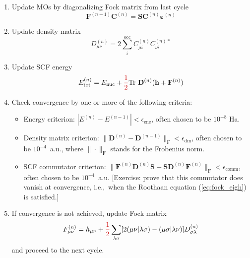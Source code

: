 \documentclass[parskip=full]{article}
\newcommand{\myred}[1]{\textcolor{myred}{#1}}
\begin{document}
\begin{enumerate}
        \begin{enumerate}
            \item Update MOs by diagonalizing Fock matrix from last cycle
            \begin{equation}    \label{eq:fock_eigh}
                \mathbf{F}^{(n-1)} \mathbf{C}^{(n)}
                    = \mathbf{S} \mathbf{C}^{(n)} \bm{\varepsilon}^{(n)}
            \end{equation}
            \item Update density matrix
            \begin{equation}
                D^{(n)}_{\mu\nu}
                    = 2 \sum_{i}^{\textrm{occ}} C^{(n)}_{\mu i} C^{(n)*}_{\nu i}
            \end{equation}
            \item Update SCF energy
            \begin{equation}    \label{eq:scf_energy}
                E^{(n)}_{\textrm{tot}}
                    = E_{\textrm{nuc}} + \myred{\frac{1}{2}} \mathrm{Tr}~\mathbf{D}^{(n)} (\mathbf{h} + \mathbf{F}^{(n)})
            \end{equation}
            \item Check convergence by one or more of the following criteria:
            \begin{itemize}
                \item Energy criterion: $|E^{(n)} - E^{(n-1)}| < \epsilon_{\textrm{ene}}$, often chosen to be $10^{-8}$ Ha.
                \item Density matrix criterion: $\|\mathbf{D}^{(n)} - \mathbf{D}^{(n-1)}\|_{\textrm{F}} < \epsilon_{\textrm{dm}}$, often chosen to be $10^{-4}$~a.u., where $\|\cdot\|_{\textrm{F}}$ stands for the Frobenius norm.
                \item SCF commutator criterion: $\|\mathbf{F}^{(n)}\mathbf{D}^{(n)}\mathbf{S} - \mathbf{S}\mathbf{D}^{(n)}\mathbf{F}^{(n)}\|_{\textrm{F}} < \epsilon_{\textrm{comm}}$, often chosen to be $10^{-4}$~a.u.
                [Exercise: prove that this commutator does vanish at convergence, i.e.,~when the Roothaan equation (\ref{eq:fock_eigh}) is satisfied.]
            \end{itemize}
            \item If convergence is not achieved, update Fock matrix
            \begin{equation}    \label{eq:fock_build}
                F^{(n)}_{\mu\nu}
                    = h_{\mu\nu} + \myred{\frac{1}{2}} \sum_{\lambda\sigma} [2 (\mu\nu|\lambda\sigma) - (\mu\sigma|\lambda\nu)] D^{(n)}_{\sigma\lambda}
            \end{equation}
            and proceed to the next cycle.
        \end{enumerate}
    \end{enumerate}
\end{document}
